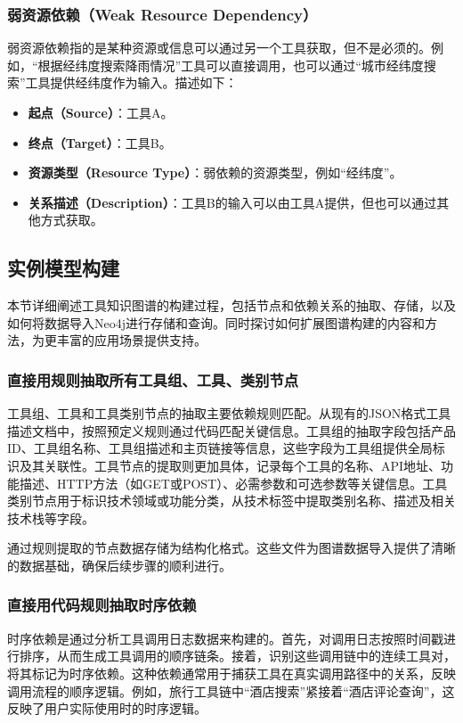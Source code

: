 \subsubsection{弱资源依赖（Weak Resource Dependency）}
弱资源依赖指的是某种资源或信息可以通过另一个工具获取，但不是必须的。例如，“根据经纬度搜索降雨情况”工具可以直接调用，也可以通过“城市经纬度搜索”工具提供经纬度作为输入。描述如下：
\begin{itemize}
    \item \textbf{起点（Source）}：工具A。
    \item \textbf{终点（Target）}：工具B。
    \item \textbf{资源类型（Resource Type）}：弱依赖的资源类型，例如``经纬度''。
    \item \textbf{关系描述（Description）}：工具B的输入可以由工具A提供，但也可以通过其他方式获取。
\end{itemize}

\subsection{实例模型构建}

本节详细阐述工具知识图谱的构建过程，包括节点和依赖关系的抽取、存储，以及如何将数据导入Neo4j进行存储和查询。同时探讨如何扩展图谱构建的内容和方法，为更丰富的应用场景提供支持。

\subsubsection{直接用规则抽取所有工具组、工具、类别节点}

工具组、工具和工具类别节点的抽取主要依赖规则匹配。从现有的JSON格式工具描述文档中，按照预定义规则通过代码匹配关键信息。工具组的抽取字段包括产品ID、工具组名称、工具组描述和主页链接等信息，这些字段为工具组提供全局标识及其关联性。工具节点的提取则更加具体，记录每个工具的名称、API地址、功能描述、HTTP方法（如GET或POST）、必需参数和可选参数等关键信息。工具类别节点用于标识技术领域或功能分类，从技术标签中提取类别名称、描述及相关技术栈等字段。

通过规则提取的节点数据存储为结构化格式。这些文件为图谱数据导入提供了清晰的数据基础，确保后续步骤的顺利进行。

\subsubsection{直接用代码规则抽取时序依赖}

时序依赖是通过分析工具调用日志数据来构建的。首先，对调用日志按照时间戳进行排序，从而生成工具调用的顺序链条。接着，识别这些调用链中的连续工具对，将其标记为时序依赖。这种依赖通常用于捕获工具在真实调用路径中的关系，反映调用流程的顺序逻辑。例如，旅行工具链中“酒店搜索”紧接着“酒店评论查询”，这反映了用户实际使用时的时序逻辑。

